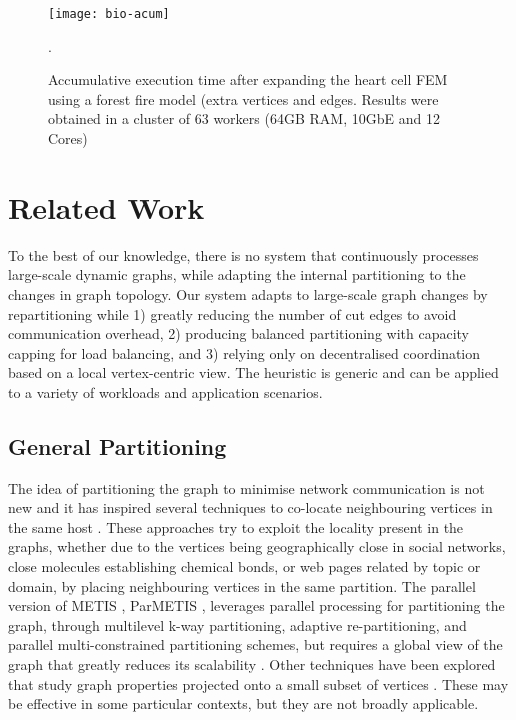 \documentclass{sig-alternate-10pt}
\begin{document}
\begin{figure}[t]
\centering


   \texttt{[image: bio-acum]}
   \caption{Accumulative execution time after expanding the heart cell FEM using a forest fire model (extra  vertices and  edges. Results were obtained in a cluster of 63 workers (64GB RAM, 10GbE and 12 Cores)}.
\vspace{-20pt}
\label{fig:bio}
\end{figure}




\section{Related Work}
\label{sec:related}


To the best of our knowledge, there is no system that continuously processes large-scale dynamic graphs, while adapting the internal partitioning to the changes in graph topology. Our system adapts to large-scale graph changes by repartitioning while 1) greatly reducing the number of cut edges to avoid communication overhead, 2) producing balanced partitioning with capacity capping for load balancing, and 3) relying only on decentralised coordination based on a local vertex-centric view. The heuristic is generic and can be applied to a variety of workloads and application scenarios. 

\subsection{General Partitioning}

The idea of partitioning the graph to minimise network communication is not new and it has inspired several techniques to co-locate neighbouring vertices in the same host \cite{Bhatt1983, Pellegrini1996, Karypis1998,Newman06,Blondel2008,Arora2009,DasSarma2010}. These approaches try to exploit the locality present in the graphs, whether due to the vertices being geographically close in social networks, close molecules establishing chemical bonds, or web pages related by topic or domain, by placing neighbouring vertices in the same partition. The parallel version of METIS \cite{metis}, ParMETIS \cite{parmetis}, leverages parallel processing for partitioning the graph, through multilevel k-way partitioning, adaptive re-partitioning, and parallel multi-constrained partitioning schemes, but requires a global view of the graph that  greatly reduces its scalability \cite{Salihoglu2012}. Other techniques have been explored that study graph properties projected onto a small subset of vertices \cite{Leskovec2007,DasSarma2010}. These may be effective in some particular contexts, but they are not broadly applicable. 
\end{document}
